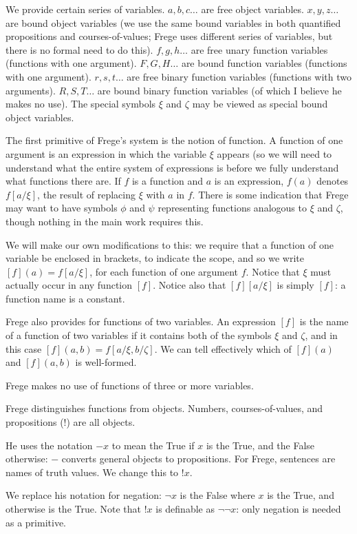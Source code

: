 \documentclass{article}
\begin{document}
We provide certain series of variables.  $a,b,c\ldots$ are free object variables.  $x,y,z\ldots$ are bound object variables (we use the same bound variables in both quantified propositions and courses-of-values;  Frege uses different series of variables, but there is no formal need to do this).  $f,g,h\ldots$ are free unary function variables (functions with one argument).  $F,G,H\dots$ are bound function variables (functions with one argument).
$r,s,t\ldots$ are free binary function variables (functions with two arguments).  $R,S,T\ldots$ are bound binary function variables (of which I believe he makes no use).  The special symbols
$\xi$ and $\zeta$ may be viewed as special bound object variables.

The first primitive of Frege's system is the notion of function.  A function of one argument is an expression in which the variable $\xi$ appears (so we will need to understand what the entire system of expressions is before we fully understand what functions there are.  If $f$ is a function and $a$ is an expression, $f(a)$ denotes $f[a/\xi]$, the result of replacing $\xi$ with $a$ in $f$.  There is some indication that Frege may want to have symbols $\phi$ and $\psi$ representing functions analogous to  $\xi$ and $\zeta$, though nothing in the main work requires this.

We will make our own modifications to this:  we require that a function of one variable be enclosed in brackets, to indicate the scope, and so we write $[f](a) = f[a/\xi]$, for each function of one argument $f$.  Notice that $\xi$ must actually occur in any function $[f]$.  Notice also that $[f][a/\xi]$ is simply $[f]$:  a function name is a constant.

Frege also provides for functions of two variables.  An expression $[f]$ is the name of a function of two variables if it contains both of the symbols $\xi$ and $\zeta$, and in this
case $[f](a,b) = f[a/\xi,b/\zeta]$.  We can tell effectively which of $[f](a)$ and $[f](a,b)$ is well-formed.

Frege makes no use of functions of three or more variables.

Frege distinguishes functions from objects.  Numbers, courses-of-values, and propositions (!) are all objects.

He uses the notation $-x$ to mean the True if $x$ is the True, and the False otherwise:  $-$ converts general objects to propositions.  For Frege, sentences are names of truth values.
We change this to $!x$.

We replace his notation for negation:  $\neg x$ is the False where $x$ is the True, and otherwise is the True.   Note that $!x$ is definable as $\neg\neg x$:  only negation is needed as a primitive.
\end{document}

